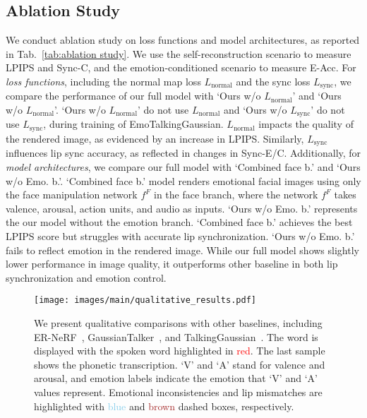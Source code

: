 \subsection{Ablation Study}
We conduct ablation study on loss functions and model architectures, as reported in Tab.~\ref{tab:ablation study}. We use the self-reconstruction scenario to measure LPIPS and Sync-C, and the emotion-conditioned scenario to measure E-Acc. For \emph{loss functions}, including the normal map loss $L_\text{normal}$ and the sync loss $L_\text{sync}$, we compare the performance of our full model with `Ours w/o $L_\text{normal}$' and `Ours w/o $L_\text{normal}$'. `Ours w/o $L_\text{normal}$' do not use $L_\text{normal}$ and `Ours w/o $L_\text{sync}$' do not use $L_\text{sync}$, during training of EmoTalkingGaussian. $L_\text{normal}$ impacts the quality of the rendered image, as evidenced by an increase in LPIPS. Similarly, $L_\text{sync}$ influences lip sync accuracy, as reflected in changes in Sync-E/C. Additionally, for \emph{model architectures}, we compare our full model with `Combined face b.' and `Ours w/o Emo. b.'. `Combined face b.' model renders emotional facial images using only the face manipulation network $f^{F}$ in the face branch, where the network $f^{F}$ takes valence, arousal, action units, and audio as inputs. `Ours w/o Emo. b.' represents the our model without the emotion branch. `Combined face b.' achieves the best LPIPS score but struggles with accurate lip synchronization. `Ours w/o Emo. b.' fails to reflect emotion in the rendered image. While our full model shows slightly lower performance in image quality, it outperforms other baseline in both lip synchronization and emotion control.




\begin{figure*}
    \centering
    \texttt{[image: images/main/qualitative\_results.pdf]}
    \caption{We present qualitative comparisons with other baselines, including ER-NeRF~\cite{li2023efficient}, GaussianTalker~\cite{cho2024gaussiantalker}, and TalkingGaussian~\cite{li2024talkinggaussian}. The word is displayed with the spoken word highlighted in \textcolor{red}{red}. The last sample shows the phonetic transcription. `V' and `A' stand for valence and arousal, and emotion labels indicate the emotion that `V' and `A' values represent. Emotional inconsistencies and lip mismatches are highlighted with \textcolor{skyblue}{blue} and \textcolor{brown}{brown} dashed boxes, respectively.}
    \label{fig:qualitative_results}
    \vspace{-3mm}
\end{figure*}